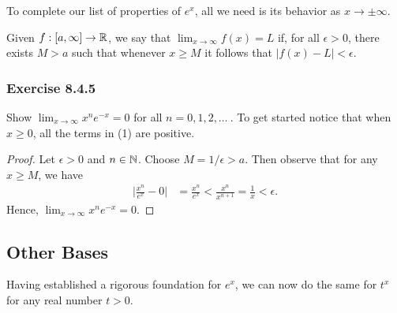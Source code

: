 To complete our list of properties of \( e^{x}  \), all we need is its behavior as \( x \to \pm \infty  \).

\begin{definition}{}{}
    Given \( f : [a,\infty ]  \to \mathbb{R} \), we say that \( \lim_{ x \to \infty  }  f(x) = L  \) if, for all \( \epsilon > 0  \), there exists \( M > a  \) such that whenever \( x \geq M  \) it follows that \( |  f(x) - L  | < \epsilon  \).
\end{definition}

\subsubsection{Exercise 8.4.5} Show \( \lim_{ x \to \infty  }  x^{n} e^{-x} = 0  \) for all \( n = 0,1,2, \dots \ \). To get started notice that when \( x \geq 0   \), all the terms in (1) are positive.
\begin{proof}
    Let \( \epsilon > 0  \) and \( n \in \mathbb{N}  \). Choose \( M = 1 / \epsilon  > a   \). Then observe that for any \( x \geq M  \), we have
    \begin{align*}
        \Big| \frac{ x^{n} }{  e^{x} }  - 0  \Big| &= \frac{ x^{n}  }{  e^{x} }  
                                                   <  \frac{ x^{n}  }{  x^{n+1} } 
                                                   = \frac{ 1 }{ x } 
                                                   < \epsilon.
    \end{align*}
    Hence, \( \lim_{ x \to \infty  }  x^{n} e^{-x} = 0. \)
\end{proof}

\subsection{Other Bases}

Having established a rigorous foundation for \( e^{x}  \), we can now do the same for \( t^{x}  \) for any real number \( t > 0   \). 

